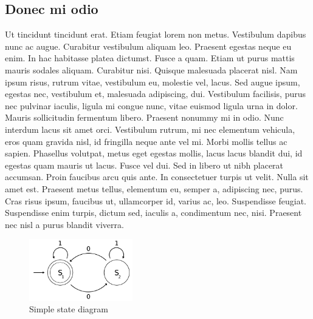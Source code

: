 \documentclass[a4paper,11pt]{scrartcl}
\begin{document}
 \subsection{Donec mi odio}
 Ut tincidunt tincidunt erat. Etiam feugiat lorem non metus. Vestibulum dapibus nunc ac augue. Curabitur vestibulum aliquam leo. Praesent egestas neque eu enim. In hac habitasse platea dictumst. Fusce a quam. Etiam ut purus mattis mauris sodales aliquam. Curabitur nisi. Quisque malesuada placerat nisl. Nam ipsum risus, rutrum vitae, vestibulum eu, molestie vel, lacus. Sed augue ipsum, egestas nec, vestibulum et, malesuada adipiscing, dui. Vestibulum facilisis, purus nec pulvinar iaculis, ligula mi congue nunc, vitae euismod ligula urna in dolor. Mauris sollicitudin fermentum libero. Praesent nonummy mi in odio. Nunc interdum lacus sit amet orci. Vestibulum rutrum, mi nec elementum vehicula, eros quam gravida nisl, id fringilla neque ante vel mi. Morbi mollis tellus ac sapien. Phasellus volutpat, metus eget egestas mollis, lacus lacus blandit dui, id egestas quam mauris ut lacus. Fusce vel dui. Sed in libero ut nibh placerat accumsan. Proin faucibus arcu quis ante. In consectetuer turpis ut velit. Nulla sit amet est. Praesent metus tellus, elementum eu, semper a, adipiscing nec, purus. Cras risus ipsum, faucibus ut, ullamcorper id, varius ac, leo. Suspendisse feugiat. Suspendisse enim turpis, dictum sed, iaculis a, condimentum nec, nisi. Praesent nec nisl a purus blandit viverra.
 
\begin{figure}[t]
       \centering
       \includegraphics[width=0.4\textwidth]{Images/state-diagram}
       \caption{Simple state diagram}
       \label{fig:sdiag}
\end{figure}
\end{document}
